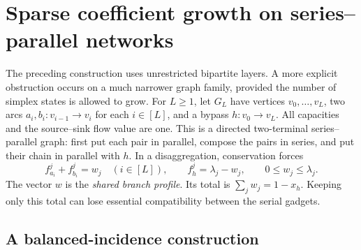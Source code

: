 \section{Sparse coefficient growth on series--parallel networks}\label{sec:sp-growth}

The preceding construction uses unrestricted bipartite layers. A more
explicit obstruction occurs on a much narrower graph family, provided
the number of simplex states is allowed to grow.
For $L\ge1$, let $G_L$ have vertices $v_0,\ldots,v_L$, two arcs
$a_i,b_i:v_{i-1}\to v_i$ for each $i\in[L]$, and a bypass
$h:v_0\to v_L$. All capacities and the source--sink flow value are one.
This is a directed two-terminal series--parallel graph: first put each
pair in parallel, compose the pairs in series, and put their chain in
parallel with $h$. In a disaggregation, conservation forces
\begin{equation}\label{eq:chain-profile}
 f^j_{a_i}+f^j_{b_i}=w_j\quad(i\in[L]),\qquad
 f^j_h=\lambda_j-w_j,
 \qquad 0\le w_j\le\lambda_j.
\end{equation}
The vector $w$ is the \emph{shared branch profile}. Its total is
$\sum_jw_j=1-x_h$. Keeping only this total can lose essential
compatibility between the serial gadgets.

\subsection{A balanced-incidence construction}

